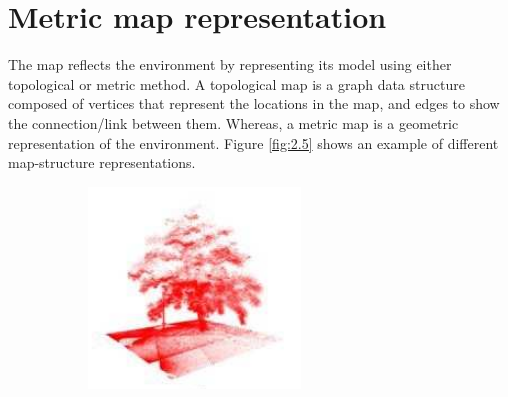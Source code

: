\documentclass[11pt,openany]{book}
\begin{document}
\section{Metric map representation}
The map reﬂects the environment by representing its model using either topological or metric method. A topological map is a graph data structure composed of vertices that represent the locations in the map, and edges to show the connection/link between them. Whereas, a metric map is a geometric representation of the environment. Figure \ref{fig:2.5} shows an example of diﬀerent map-structure representations.
\begin{figure}[H]
    \centering
    \begin{subfigure}[H]{0.4\linewidth}
        \centering
        \includegraphics[width=\linewidth]{assets/2_5_a.png}
        \caption{{}}
        \label{fig:2.5a}
    \end{subfigure}
    \begin{subfigure}[H]{0.4\linewidth}
        \centering

\end{subfigure}
\end{figure}
\end{document}
